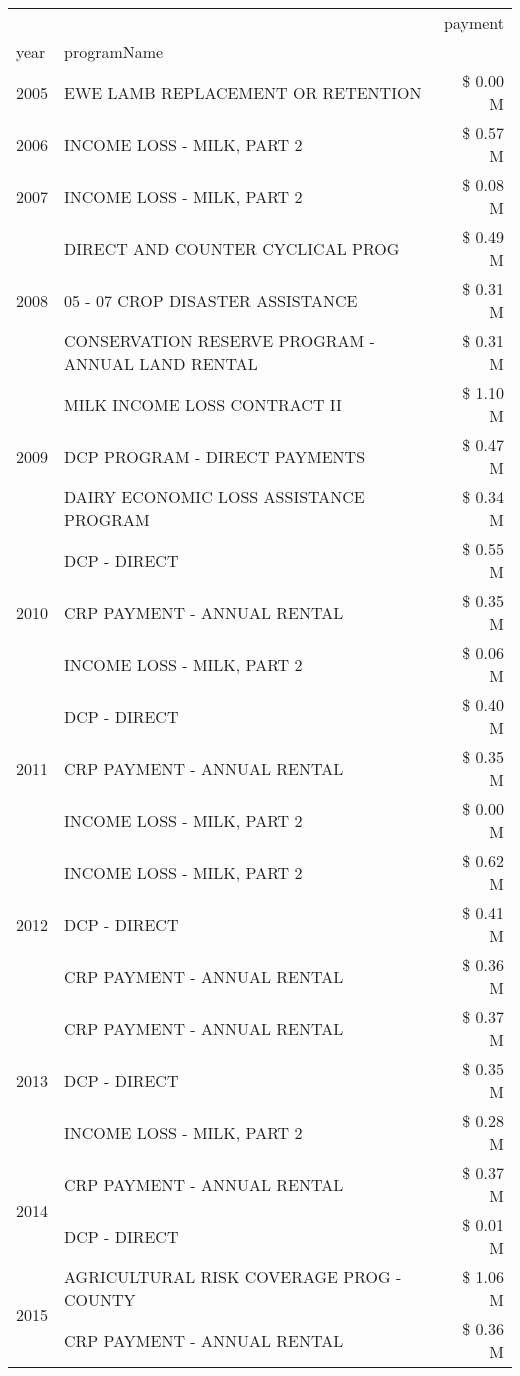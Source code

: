 \begin{tabular}{llr}
\toprule
 &  & payment \\
year & programName &  \\
\midrule
2005 & EWE LAMB REPLACEMENT OR RETENTION & \$ 0.00 M \\
\cline{1-3}
2006 & INCOME LOSS - MILK, PART 2 & \$ 0.57 M \\
\cline{1-3}
2007 & INCOME LOSS - MILK, PART 2 & \$ 0.08 M \\
\cline{1-3}
\multirow[t]{3}{*}{2008} & DIRECT AND COUNTER CYCLICAL PROG & \$ 0.49 M \\
 & 05 - 07 CROP DISASTER ASSISTANCE & \$ 0.31 M \\
 & CONSERVATION RESERVE PROGRAM - ANNUAL LAND RENTAL & \$ 0.31 M \\
\cline{1-3}
\multirow[t]{3}{*}{2009} & MILK INCOME LOSS CONTRACT II & \$ 1.10 M \\
 & DCP PROGRAM - DIRECT PAYMENTS & \$ 0.47 M \\
 & DAIRY ECONOMIC LOSS ASSISTANCE PROGRAM & \$ 0.34 M \\
\cline{1-3}
\multirow[t]{3}{*}{2010} & DCP - DIRECT & \$ 0.55 M \\
 & CRP PAYMENT - ANNUAL RENTAL & \$ 0.35 M \\
 & INCOME LOSS - MILK, PART 2 & \$ 0.06 M \\
\cline{1-3}
\multirow[t]{3}{*}{2011} & DCP - DIRECT & \$ 0.40 M \\
 & CRP PAYMENT - ANNUAL RENTAL & \$ 0.35 M \\
 & INCOME LOSS - MILK, PART 2 & \$ 0.00 M \\
\cline{1-3}
\multirow[t]{3}{*}{2012} & INCOME LOSS - MILK, PART 2 & \$ 0.62 M \\
 & DCP - DIRECT & \$ 0.41 M \\
 & CRP PAYMENT - ANNUAL RENTAL & \$ 0.36 M \\
\cline{1-3}
\multirow[t]{3}{*}{2013} & CRP PAYMENT - ANNUAL RENTAL & \$ 0.37 M \\
 & DCP - DIRECT & \$ 0.35 M \\
 & INCOME LOSS - MILK, PART 2 & \$ 0.28 M \\
\cline{1-3}
\multirow[t]{2}{*}{2014} & CRP PAYMENT - ANNUAL RENTAL & \$ 0.37 M \\
 & DCP - DIRECT & \$ 0.01 M \\
\cline{1-3}
\multirow[t]{3}{*}{2015} & AGRICULTURAL RISK COVERAGE PROG - COUNTY & \$ 1.06 M \\
 & CRP PAYMENT - ANNUAL RENTAL & \$ 0.36 M \\

\end{tabular}
